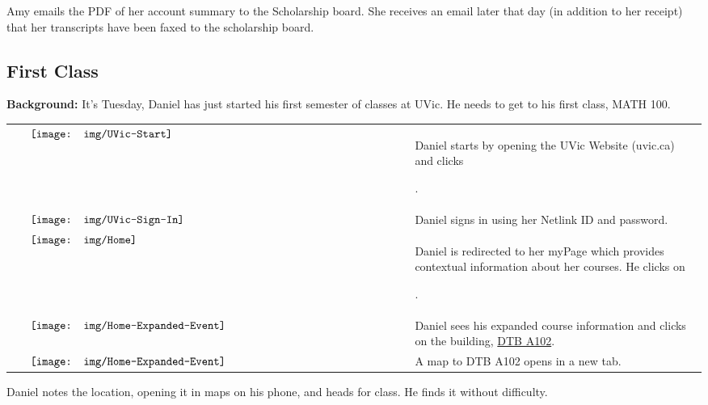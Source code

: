 \documentclass{article}
\newcommand{\button}[1]{
    \begin{tikzpicture}[baseline=0ex] 
        \node[anchor=base, text height=1em, text depth=1ex, inner ysep=0pt, draw=black!13, fill=black!3, rounded corners=2pt] at (0,0) {
            \footnotesize{#1}
        }; 
    \end{tikzpicture}
}
\renewcommand{\arraystretch}{1.5} %
\begin{document}
Amy emails the PDF of her account summary to the Scholarship board. She receives an email later that day (in addition to her receipt) that her transcripts have been faxed to the scholarship board.

\pagebreak
\subsection{First Class}

\textbf{Background:} It's Tuesday, Daniel has just started his first semester of classes at UVic. He needs to get to his first class, MATH 100.

\renewcommand*{\arraystretch}{12}
\begin{longtable}[t]{p{10cm}>{\raggedright\arraybackslash}p{4cm}}
     $\vcenter{\texttt{[image: img/UVic-Start]}}$ & Daniel starts by opening the UVic Website (uvic.ca) and clicks \button{myPage}. \\
     $\vcenter{\texttt{[image: img/UVic-Sign-In]}}$ & Daniel signs in using her Netlink ID and password. \\
     $\vcenter{\texttt{[image: img/Home]}}$ & Daniel is redirected to her myPage which provides contextual information about her courses. He clicks on \button{Math 100}.\\
     $\vcenter{\texttt{[image: img/Home-Expanded-Event]}}$ & Daniel sees his expanded course information and clicks on the building, \underline{DTB A102}.\\
     $\vcenter{\texttt{[image: img/Home-Expanded-Event]}}$ & A map to DTB A102 opens in a new tab.\\
\end{longtable}

Daniel notes the location, opening it in maps on his phone, and heads for class. He finds it without difficulty.

%
%
%



%
%
%



\end{document}
